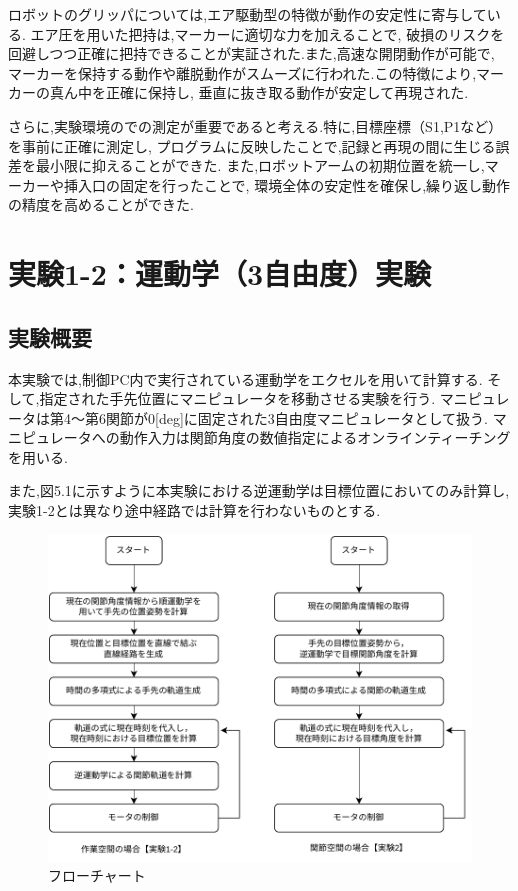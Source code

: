 ロボットのグリッパについては,エア駆動型の特徴が動作の安定性に寄与している.
エア圧を用いた把持は,マーカーに適切な力を加えることで,
破損のリスクを回避しつつ正確に把持できることが実証された.また,高速な開閉動作が可能で,
マーカーを保持する動作や離脱動作がスムーズに行われた.この特徴により,マーカーの真ん中を正確に保持し,
垂直に抜き取る動作が安定して再現された.

さらに,実験環境のでの測定が重要であると考える.特に,目標座標（S1,P1など）を事前に正確に測定し,
プログラムに反映したことで,記録と再現の間に生じる誤差を最小限に抑えることができた.
また,ロボットアームの初期位置を統一し,マーカーや挿入口の固定を行ったことで,
環境全体の安定性を確保し,繰り返し動作の精度を高めることができた.

\section{実験1-2：運動学（3自由度）実験}

\subsection{実験概要}
本実験では,制御PC内で実行されている運動学をエクセルを用いて計算する.
そして,指定された手先位置にマニピュレータを移動させる実験を行う.
マニピュレータは第4～第6関節が0[deg]に固定された3自由度マニピュレータとして扱う.
マニピュレータへの動作入力は関節角度の数値指定によるオンラインティーチングを用いる.

また,図5.1に示すように本実験における逆運動学は目標位置においてのみ計算し,
実験1-2とは異なり途中経路では計算を行わないものとする.

\begin{figure}[h]
  \centering
  \includegraphics[scale=0.75]{sozai/3.pdf}
  \caption{フローチャート}
\end{figure}


